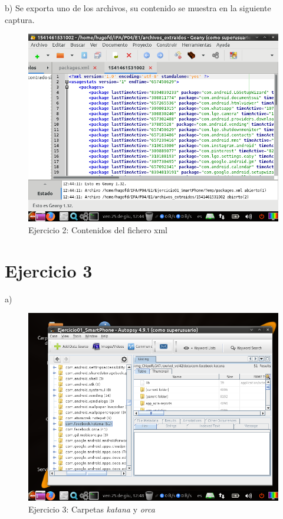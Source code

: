 \documentclass[11pt]{article}
\begin{document}
b) Se exporta uno de los archivos, su contenido se muestra en la siguiente captura.

\begin{figure}[H]
    \caption{Ejercicio 2: Contenidos del fichero xml}
    \centering
    \includegraphics[scale=0.7]{e2-2.png}
\end{figure}

\section{Ejercicio 3}
a)

\begin{figure}[H]
    \caption{Ejercicio 3: Carpetas \textit{katana} y \textit{orca}}
    \centering
    \includegraphics[scale=0.7]{e3-1.png}
\end{figure}
\end{document}
